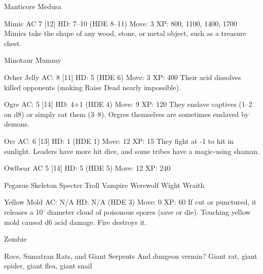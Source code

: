 Manticore Medusa

Mimic AC 7 {[}12{]} HD: 7--10 (HDE 8--11) Move: 3 XP: 800, 1100, 1400,
1700 Mimics take the shape of any wood, stone, or metal object, such as
a treasure chest.

Minotaur Mummy

Ocher Jelly AC: 8 {[}11{]} HD: 5 (HDE 6) Move: 3 XP: 400 Their acid
dissolves killed opponents (making Raise Dead nearly impossible).

Ogre AC: 5 {[}14{]} HD: 4+1 (HDE 4) Move: 9 XP: 120 They enslave
captives (1--2 on d8) or simply eat them (3--8). Orgres themselves are
sometimes enslaved by demons.

Orc AC: 6 {[}13{]} HD: 1 (HDE 1) Move: 12 XP: 15 They fight at -1 to hit
in sunlight. Leaders have more hit dice, and some tribes have a
magic-using shaman.

Owlbear AC 5 {[}14{]} HD: 5 (HDE 5) Move: 12 XP: 240

Pegasus Skeleton Specter Troll Vampire Werewolf Wight Wraith

Yellow Mold AC: N/A HD: N/A (HDE 3) Move: 0 XP: 60 If cut or punctured,
it releases a 10' diameter cloud of poisonous spores (save or die).
Touching yellow mold caused d6 acid damage. Fire destroys it.

Zombie

Rocs, Sumatran Rats, and Giant Serpents And dungeon vermin? Giant rat,
giant spider, giant flea, giant snail
